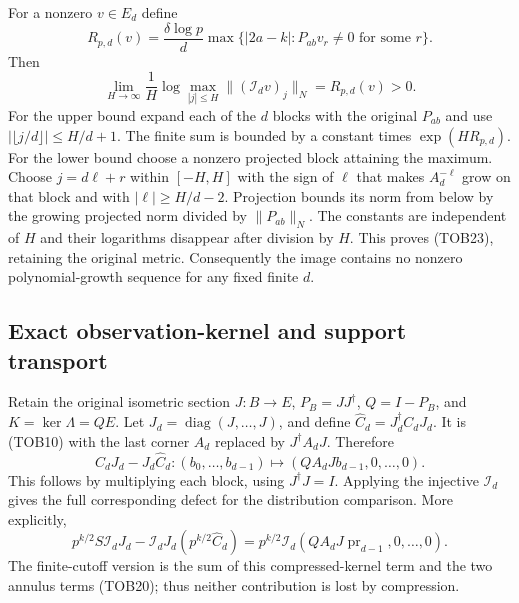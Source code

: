 For a nonzero $v\in E_d$ define
\begin{equation}\tag{TOB22}
 R_{p,d}(v)=\frac{\delta\log p}{d}
       \max\{|2a-k|:P_{ab}v_r\ne0\text{ for some }r\}.
\end{equation}
Then
\begin{equation}\tag{TOB23}
 \lim_{H\to\infty}\frac1H
   \log\max_{|j|\le H}\|(\mathcal I_dv)_j\|_N
 =R_{p,d}(v)>0.
\end{equation}
For the upper bound expand each of the $d$ blocks with the original
$P_{ab}$ and use $|\lfloor j/d\rfloor|\le H/d+1$. The finite
sum is bounded by a constant times $\exp(HR_{p,d})$.
For the lower bound choose a nonzero projected block attaining the
maximum. Choose $j=d\ell+r$ within $[-H,H]$ with the sign of
$\ell$ that makes $A_d^{-\ell}$ grow on that block and with
$|\ell|\ge H/d-2$. Projection bounds its norm from below by
the growing projected norm divided by $\|P_{ab}\|_N$.
The constants are independent of $H$ and their logarithms disappear
after division by $H$. This proves (TOB23), retaining the original
metric. Consequently the image contains no nonzero
polynomial-growth sequence for any fixed finite $d$.

\subsection{Exact observation-kernel and support transport}

Retain the original isometric section $J:B\to E$,
$P_B=JJ^\dagger$, $Q=I-P_B$, and $K=\ker\Lambda=QE$.
Let $J_d=\operatorname{diag}(J,\ldots,J)$, and define
$\widehat C_d=J_d^\dagger C_dJ_d$. It is (TOB10) with the last
corner $A_d$ replaced by $J^\dagger A_dJ$. Therefore
\begin{equation}\tag{TOB24}
 C_dJ_d-J_d\widehat C_d
  :(b_0,\ldots,b_{d-1})\longmapsto
       (QA_dJb_{d-1},0,\ldots,0).
\end{equation}
This follows by multiplying each block, using $J^\dagger J=I$.
Applying the injective $\mathcal I_d$ gives the full corresponding
defect for the distribution comparison. More explicitly,
\begin{equation}\tag{TOB25}
 p^{k/2}S\mathcal I_dJ_d
     -\mathcal I_dJ_d(p^{k/2}\widehat C_d)
 =p^{k/2}\mathcal I_d
       (QA_dJ\operatorname{pr}_{d-1},0,\ldots,0).
\end{equation}
The finite-cutoff version is the sum of this compressed-kernel term
and the two annulus terms (TOB20); thus neither contribution is
lost by compression.

